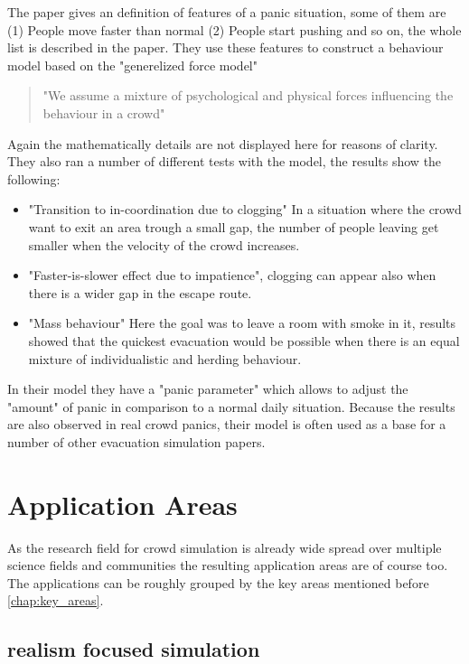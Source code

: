 \documentclass[sigconf]{acmart}
\begin{document}
The paper gives an definition of features of a panic situation, some of them are (1) People move faster than normal (2) People start pushing and so on, the whole list is described in the paper. They use these features to construct a behaviour model based on the "generelized force model"\cite{hindsley_investigation_1986}
\begin{quote}
"We assume a mixture of psychological and physical forces influencing the behaviour in a crowd"
\end{quote}
Again the mathematically details are not displayed here for reasons of clarity. They also ran a number of different tests with the model, the results show the following:
\begin{itemize}
\item "Transition to in-coordination due to clogging" In a situation where the crowd want to exit an area trough a small gap, the number of people leaving get smaller when the velocity of the crowd increases.
\item "Faster-is-slower effect due to impatience", clogging can appear also when there is a wider gap in the escape route. 
\item "Mass behaviour" Here the goal was to leave a room with smoke in it, results showed that the quickest evacuation would be possible when there is an equal mixture of individualistic and herding behaviour. 
\end{itemize}
In their model they have a "panic parameter" \label{term:panicParameter} which allows to adjust the "amount" of panic in comparison to a normal daily situation. Because the results are also observed in real crowd panics, their model is often used as a base for a number of other evacuation simulation papers. \cite{braun_simulating_2005} \cite{zheng_modeling_2009}

\section{Application Areas}

As the research field for crowd simulation is already wide spread over multiple science fields and communities the resulting application areas are of course too. The applications can be roughly grouped by the key areas mentioned before \ref{chap:key_areas}. 

\subsection{realism focused simulation}
\end{document}
